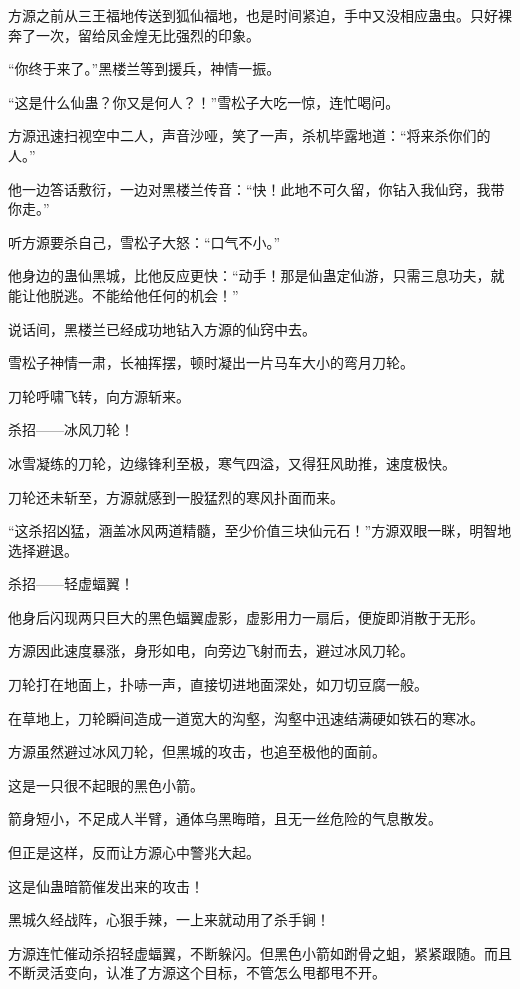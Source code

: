 \begin{this_body}
方源之前从三王福地传送到狐仙福地，也是时间紧迫，手中又没相应蛊虫。只好裸奔了一次，留给凤金煌无比强烈的印象。

“你终于来了。”黑楼兰等到援兵，神情一振。

“这是什么仙蛊？你又是何人？！”雪松子大吃一惊，连忙喝问。

方源迅速扫视空中二人，声音沙哑，笑了一声，杀机毕露地道：“将来杀你们的人。”

他一边答话敷衍，一边对黑楼兰传音：“快！此地不可久留，你钻入我仙窍，我带你走。”

听方源要杀自己，雪松子大怒：“口气不小。”

他身边的蛊仙黑城，比他反应更快：“动手！那是仙蛊定仙游，只需三息功夫，就能让他脱逃。不能给他任何的机会！”

说话间，黑楼兰已经成功地钻入方源的仙窍中去。

雪松子神情一肃，长袖挥摆，顿时凝出一片马车大小的弯月刀轮。

刀轮呼啸飞转，向方源斩来。

杀招——冰风刀轮！

冰雪凝练的刀轮，边缘锋利至极，寒气四溢，又得狂风助推，速度极快。

刀轮还未斩至，方源就感到一股猛烈的寒风扑面而来。

“这杀招凶猛，涵盖冰风两道精髓，至少价值三块仙元石！”方源双眼一眯，明智地选择避退。

杀招——轻虚蝠翼！

他身后闪现两只巨大的黑色蝠翼虚影，虚影用力一扇后，便旋即消散于无形。

方源因此速度暴涨，身形如电，向旁边飞射而去，避过冰风刀轮。

刀轮打在地面上，扑哧一声，直接切进地面深处，如刀切豆腐一般。

在草地上，刀轮瞬间造成一道宽大的沟壑，沟壑中迅速结满硬如铁石的寒冰。

方源虽然避过冰风刀轮，但黑城的攻击，也追至极他的面前。

这是一只很不起眼的黑色小箭。

箭身短小，不足成人半臂，通体乌黑晦暗，且无一丝危险的气息散发。

但正是这样，反而让方源心中警兆大起。

这是仙蛊暗箭催发出来的攻击！

黑城久经战阵，心狠手辣，一上来就动用了杀手锏！

方源连忙催动杀招轻虚蝠翼，不断躲闪。但黑色小箭如跗骨之蛆，紧紧跟随。而且不断灵活变向，认准了方源这个目标，不管怎么甩都甩不开。


\end{this_body}
